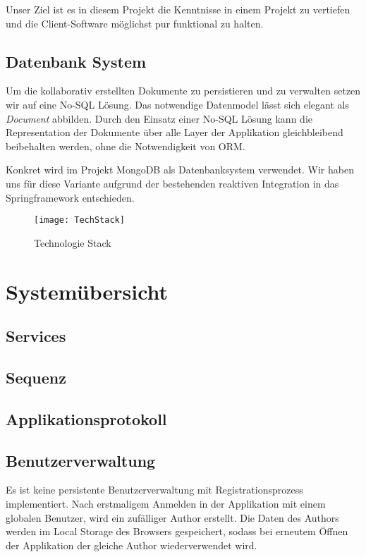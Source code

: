 Unser Ziel ist es in diesem Projekt die Kenntnisse in einem Projekt zu vertiefen und die Client-Software möglichst pur funktional zu halten.


\subsection{Datenbank System}
Um die kollaborativ erstellten Dokumente zu persistieren und zu verwalten setzen wir auf eine No-SQL Lösung.
Das notwendige Datenmodel lässt sich elegant als \emph{Document} abbilden.
Durch den Einsatz einer No-SQL Lösung kann die Representation der Dokumente über alle Layer der Applikation gleichbleibend beibehalten werden,
ohne die Notwendigkeit von ORM\@.

Konkret wird im Projekt MongoDB als Datenbanksystem verwendet.
Wir haben uns für diese Variante aufgrund der bestehenden reaktiven Integration in das Springframework entschieden.


\begin{figure}
    \texttt{[image: TechStack]}
    \caption{Technologie Stack}
\end{figure}


\section{Systemübersicht}

\subsection{Services}

\subsection{Sequenz}

\subsection{Applikationsprotokoll}

\subsection{Benutzerverwaltung}
Es ist keine persistente Benutzerverwaltung mit Registrationsprozess implementiert.
Nach erstmaligem Anmelden in der Applikation mit einem globalen Benutzer, wird ein zufälliger Author erstellt.
Die Daten des Authors werden im Local Storage des Browsers gespeichert, sodass bei erneutem Öffnen der Applikation der gleiche Author wiederverwendet wird.
